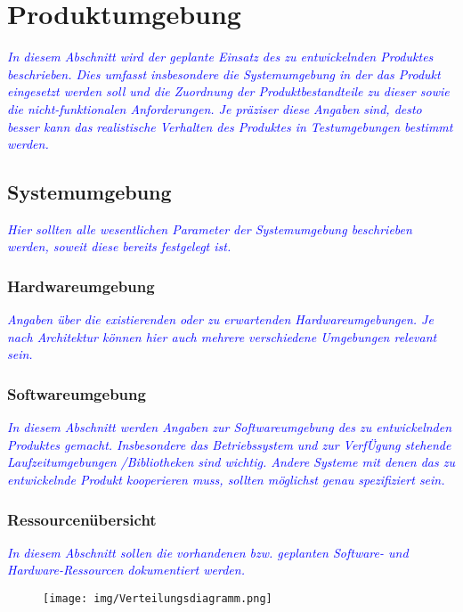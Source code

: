 \section{Produktumgebung}
\textcolor{blue}{\textit{In diesem Abschnitt wird der geplante Einsatz des zu entwickelnden Produktes beschrieben. Dies umfasst insbesondere die Systemumgebung in der das Produkt eingesetzt werden soll und die Zuordnung der Produktbestandteile zu dieser sowie die nicht-funktionalen Anforderungen. Je präziser diese Angaben sind, desto besser kann das realistische Verhalten des Produktes in Testumgebungen bestimmt werden.}}

\subsection{Systemumgebung}
\textcolor{blue}{\textit{Hier sollten alle wesentlichen Parameter der Systemumgebung beschrieben werden, soweit diese bereits festgelegt ist.}}

\subsubsection{Hardwareumgebung}
\textcolor{blue}{\textit{Angaben über die existierenden oder zu erwartenden Hardwareumgebungen. Je nach Architektur können hier auch mehrere verschiedene Umgebungen relevant sein.}}

\subsubsection{Softwareumgebung}
\textcolor{blue}{\textit{In diesem Abschnitt werden Angaben zur Softwareumgebung des zu entwickelnden Produktes gemacht. Insbesondere das Betriebssystem und zur VerfÜgung stehende Laufzeitumgebungen /Bibliotheken sind wichtig. Andere Systeme mit denen das zu entwickelnde Produkt kooperieren muss, sollten möglichst genau spezifiziert sein.}}

\subsubsection{Ressourcenübersicht}
\textcolor{blue}{\textit{In diesem Abschnitt sollen die vorhandenen bzw. geplanten Software- und Hardware-Ressourcen dokumentiert werden.}}

\begin{figure}[H]
\centering
\texttt{[image: img/Verteilungsdiagramm.png]}
\end{figure}